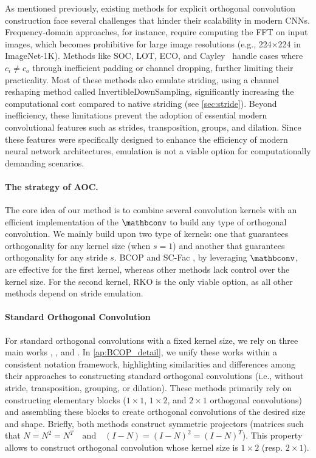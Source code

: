 
As mentioned previously, existing methods for explicit orthogonal convolution construction face several challenges that hinder their scalability in modern CNNs. Frequency-domain approaches, for instance, require computing the FFT on input images, which becomes prohibitive for large image resolutions (e.g., 224×224 in ImageNet-1K). Methods like SOC, LOT, ECO, and Cayley~\cite{singla_skew_2021,xu_lot_2023,yu_constructing_2021,trockman_orthogonalizing_2021} handle cases where $ c_i \neq c_o $ through inefficient padding or channel dropping, further limiting their practicality. Most of these methods also emulate striding, using a channel reshaping method called InvertibleDownSampling, significantly increasing the computational cost compared to native striding (see \cref{sec:stride}). Beyond inefficiency, these limitations prevent the adoption of essential modern convolutional features such as strides, transposition, groups, and dilation. Since these features were specifically designed to enhance the efficiency of modern neural network architectures, emulation is not a viable option for computationally demanding scenarios.
\paragraph{The strategy of AOC.}  The core idea of our method is to combine several convolution kernels with an efficient implementation of the \Bconv{} $\mathbconv$ to build any type of orthogonal convolution. We mainly build upon two type of kernels: one that guarantees orthogonality for any kernel size (when \( s=1 \)) and another that guarantees orthogonality for any stride \( s \). BCOP and SC-Fac \cite{li_preventing_2019, su_scaling-up_2021}, by leveraging \Bconv{} $\mathbconv$, are effective for the first kernel, whereas other methods lack control over the kernel size. For the second kernel, RKO \cite{serrurier_achieving_2021} is the only viable option, as all other methods depend on stride emulation.

\paragraph{Standard Orthogonal Convolution}\label{sec:standard}  
    For standard orthogonal convolutions with a fixed kernel size, we rely on three main works \cite{xiao_dynamical_2018}, \cite{li_preventing_2019}, and \cite{su_scaling-up_2021}. In \cref{ap:BCOP_detail}, we unify these works within a consistent notation framework, highlighting similarities and differences among their approaches to constructing standard orthogonal convolutions (i.e., without stride, transposition, grouping, or dilation). These methods primarily rely on constructing elementary blocks ($1 \times 1$, $1 \times 2$, and $2 \times 1$ orthogonal convolutions) and assembling these blocks to create orthogonal convolutions of the desired size and shape. 
    Briefly, both methods construct symmetric projectors (matrices such that $N = N^2 = N^T \quad \text{and} \quad (I - N) = (I - N)^2 = (I - N)^T$). This property allows to construct orthogonal convolution whose kernel size is $1\times 2$ (resp. $2\times 1$).

